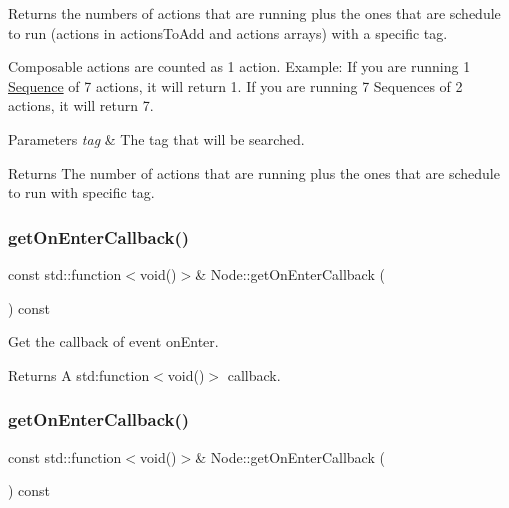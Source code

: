 Returns the numbers of actions that are running plus the ones that are schedule to run (actions in actions\+To\+Add and actions arrays) with a specific tag.

Composable actions are counted as 1 action. Example\+: If you are running 1 \hyperlink{classSequence}{Sequence} of 7 actions, it will return 1. If you are running 7 Sequences of 2 actions, it will return 7.


\begin{DoxyParams}{Parameters}
{\em tag} & The tag that will be searched.\\
\hline
\end{DoxyParams}
\begin{DoxyReturn}{Returns}
The number of actions that are running plus the ones that are schedule to run with specific tag. 
\end{DoxyReturn}
\mbox{\label{classNode_ad7b097bc5f33406aa84f0b31cabc8c91}} 
\subsubsection{\texorpdfstring{get\+On\+Enter\+Callback()}{getOnEnterCallback()}\hspace{0.1cm}{\footnotesize\ttfamily [1/2]}}
{\footnotesize\ttfamily const std\+::function$<$void()$>$\& Node\+::get\+On\+Enter\+Callback (\begin{DoxyParamCaption}{ }\end{DoxyParamCaption}) const\hspace{0.3cm}{\ttfamily [inline]}}

Get the callback of event on\+Enter. \begin{DoxyReturn}{Returns}
A std\+:function$<$void()$>$ callback. 
\end{DoxyReturn}
\mbox{\label{classNode_ad7b097bc5f33406aa84f0b31cabc8c91}} 
\subsubsection{\texorpdfstring{get\+On\+Enter\+Callback()}{getOnEnterCallback()}\hspace{0.1cm}{\footnotesize\ttfamily [2/2]}}
{\footnotesize\ttfamily const std\+::function$<$void()$>$\& Node\+::get\+On\+Enter\+Callback (\begin{DoxyParamCaption}{ }\end{DoxyParamCaption}) const\hspace{0.3cm}{\ttfamily [inline]}}

